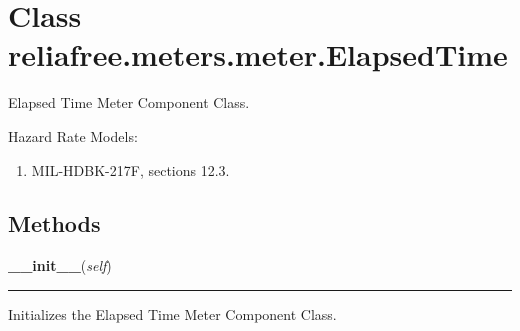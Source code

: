 %
%
%


\section{Class reliafree.meters.meter.ElapsedTime}

    \label{reliafree:meters:meter:ElapsedTime}
Elapsed Time Meter Component Class.

Hazard Rate Models:

\begin{enumerate}

\setlength{\parskip}{0.5ex}
  \item MIL-HDBK-217F, sections 12.3.

\end{enumerate}



  \subsection{Methods}

    \label{reliafree:meters:meter:ElapsedTime:__init__}

    \vspace{0.5ex}

\hspace{.8\funcindent}\begin{boxedminipage}{\funcwidth}

    \raggedright \textbf{\_\_init\_\_}(\textit{self})

    \vspace{-1.5ex}

    \rule{\textwidth}{0.5\fboxrule}
\setlength{\parskip}{2ex}
    Initializes the Elapsed Time Meter Component Class.

\setlength{\parskip}{1ex}
    \end{boxedminipage}

